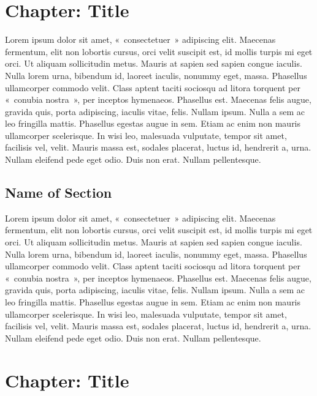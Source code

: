 \documentclass[Master of Arts,synopsis]{iitmdiss}
\begin{document}
\begin{doublespacing}
\section{Chapter: Title}
\hrulefill


Lorem ipsum dolor sit amet, «~consectetuer~» adipiscing elit. Maecenas fermentum, elit non lobortis cursus, orci velit suscipit est, id mollis turpis mi eget orci. Ut aliquam sollicitudin metus. Mauris at sapien sed sapien congue iaculis. Nulla lorem urna, bibendum id, laoreet iaculis, nonummy eget, massa. Phasellus ullamcorper commodo velit. Class aptent taciti sociosqu ad litora torquent per «~conubia nostra~», per inceptos hymenaeos. Phasellus est. Maecenas felis augue, gravida quis, porta adipiscing, iaculis vitae, felis. Nullam ipsum. Nulla a sem ac leo fringilla mattis. Phasellus egestas augue in sem. Etiam ac enim non mauris ullamcorper scelerisque. In wisi leo, malesuada vulputate, tempor sit amet, facilisis vel, velit. Mauris massa est, sodales placerat, luctus id, hendrerit a, urna. Nullam eleifend pede eget odio. Duis non erat. Nullam pellentesque.
 

\subsection{Name of Section}

Lorem ipsum dolor sit amet, «~consectetuer~» adipiscing elit. Maecenas fermentum, elit non lobortis cursus, orci velit suscipit est, id mollis turpis mi eget orci. Ut aliquam sollicitudin metus. Mauris at sapien sed sapien congue iaculis. Nulla lorem urna, bibendum id, laoreet iaculis, nonummy eget, massa. Phasellus ullamcorper commodo velit. Class aptent taciti sociosqu ad litora torquent per «~conubia nostra~», per inceptos hymenaeos. Phasellus est. Maecenas felis augue, gravida quis, porta adipiscing, iaculis vitae, felis. Nullam ipsum. Nulla a sem ac leo fringilla mattis. Phasellus egestas augue in sem. Etiam ac enim non mauris ullamcorper scelerisque. In wisi leo, malesuada vulputate, tempor sit amet, facilisis vel, velit. Mauris massa est, sodales placerat, luctus id, hendrerit a, urna. Nullam eleifend pede eget odio. Duis non erat. Nullam pellentesque.

\newpage
\section{Chapter: Title}
\hrulefill



\end{doublespacing}
\end{document}
